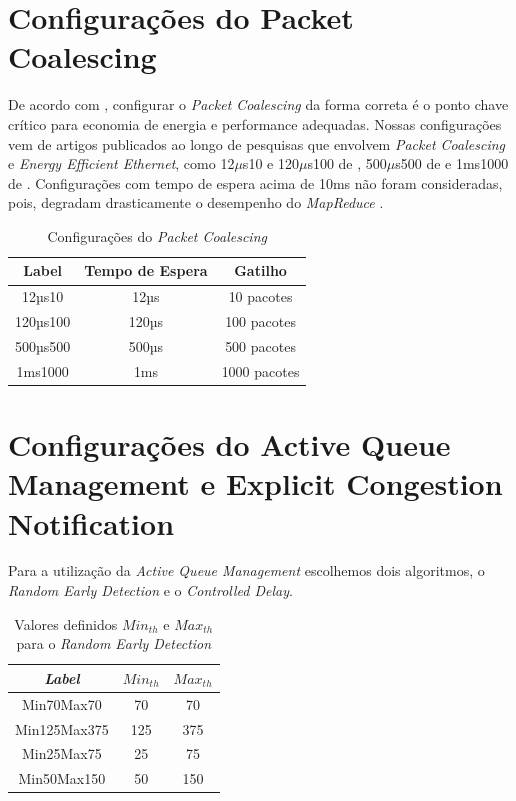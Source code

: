 \section{Configurações do Packet Coalescing}

De acordo com \cite{herreri2012optimal}, configurar o \emph{Packet Coalescing} da forma correta é o ponto chave crítico para economia de energia e performance adequadas. Nossas configurações vem de artigos publicados ao longo de pesquisas que envolvem \emph{Packet Coalescing} e \emph{Energy Efficient Ethernet}, como 12$\mu$s10 e 120$\mu$s100 de \cite{christensen2010ieee}, 500$\mu$s500 de \cite{silva2018eon} e 1ms1000 de \cite{reviriego2010burst}. Configurações com tempo de espera acima de 10ms não foram consideradas, pois, degradam drasticamente o desempenho do \emph{MapReduce} \cite {silva2018eon}.

\begin{table}[!htp]
\centering
\caption{Configurações do \emph{Packet Coalescing}}
\label{Configurações do Packet Coalescing}
\def\arraystretch{1.2}
\begin{tabular}{c c c}
\hline
Label & Tempo de Espera & Gatilho\\
\hline
12µs10   & 12µs  & 10 pacotes\\
120µs100 & 120µs & 100 pacotes\\
500µs500 & 500µs & 500 pacotes\\
1ms1000  & 1ms   & 1000 pacotes\\
\hline
\end{tabular}
\end{table}

\section{Configurações do Active Queue Management e Explicit Congestion Notification}

Para a utilização da \emph{Active Queue Management} escolhemos dois algoritmos, o \emph{Random Early Detection} e o \emph{Controlled Delay}.

\begin{table}[!htp]
\centering
\caption{Valores definidos {$\mathit{Min}_\mathit{th}$} e {$\mathit{Max}_\mathit{th}$} para o \emph{Random Early Detection}}
\label{Valores definidos para o RED}
\def\arraystretch{1.2}
\begin{tabular}{c c c}
\hline
\emph{Label} & {$\mathit{Min}_\mathit{th}$} & {$\mathit{Max}_\mathit{th}$}\\
\hline
Min70Max70 & 70  & 70\\
Min125Max375 & 125  & 375\\
Min25Max75 & 25  & 75\\
Min50Max150 & 50  & 150\\
\hline
\end{tabular}
\end{table}

